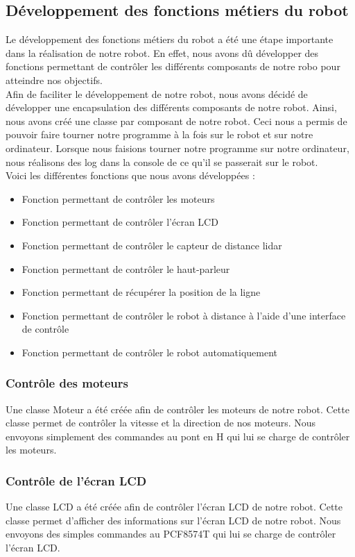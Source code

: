 \documentclass[a4paper, 12pt]{report}
\begin{document}
\subsection{Développement des fonctions métiers du robot}
Le développement des fonctions métiers du robot a été une étape importante dans la réalisation de notre robot. En effet, nous avons dû développer des fonctions permettant de contrôler les différents composants de notre robo pour atteindre nos objectifs.
\\
Afin de faciliter le développement de notre robot, nous avons décidé de développer une encapsulation des différents composants de notre robot. Ainsi, nous avons créé une classe par composant de notre robot. Ceci nous a permis de pouvoir faire tourner notre programme à la fois sur le robot et sur notre ordinateur. Lorsque nous faisions tourner notre programme sur notre ordinateur, nous réalisons des log dans la console de ce qu'il se passerait sur le robot.
\\
Voici les différentes fonctions que nous avons développées :
\begin{itemize}
    \item Fonction permettant de contrôler les moteurs
    \item Fonction permettant de contrôler l'écran LCD
    \item Fonction permettant de contrôler le capteur de distance lidar
    \item Fonction permettant de contrôler le haut-parleur
    \item Fonction permettant de récupérer la position de la ligne
    \item Fonction permettant de contrôler le robot à distance à l'aide d'une interface de contrôle
    \item Fonction permettant de contrôler le robot automatiquement
\end{itemize}

\subsubsection{Contrôle des moteurs}
Une classe Moteur a été créée afin de contrôler les moteurs de notre robot. Cette classe permet de contrôler la vitesse et la direction de nos moteurs. 
Nous envoyons simplement des commandes au pont en H qui lui se charge de contrôler les moteurs.

\subsubsection*{Contrôle de l'écran LCD}
Une classe LCD a été créée afin de contrôler l'écran LCD de notre robot. Cette classe permet d'afficher des informations sur l'écran LCD de notre robot.
Nous envoyons des simples commandes au PCF8574T qui lui se charge de contrôler l'écran LCD.
\end{document}
